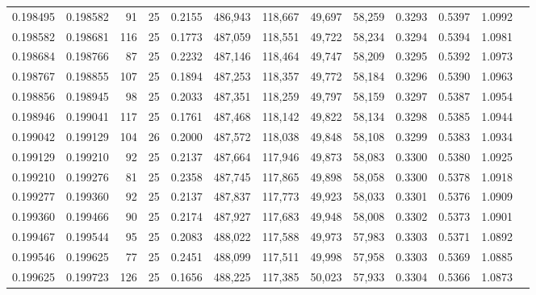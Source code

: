 \begin{tabular}{rrrrrrrrrrrrr}
0.198495 & 0.198582 &    91 &  25 &                                     0.2155 & 486,943 & 118,667 &  49,697 &  58,259 & 0.3293 & 0.5397 & 1.0992 \\
0.198582 & 0.198681 &   116 &  25 &                                     0.1773 & 487,059 & 118,551 &  49,722 &  58,234 & 0.3294 & 0.5394 & 1.0981 \\
0.198684 & 0.198766 &    87 &  25 &                                     0.2232 & 487,146 & 118,464 &  49,747 &  58,209 & 0.3295 & 0.5392 & 1.0973 \\
0.198767 & 0.198855 &   107 &  25 &                                     0.1894 & 487,253 & 118,357 &  49,772 &  58,184 & 0.3296 & 0.5390 & 1.0963 \\
0.198856 & 0.198945 &    98 &  25 &                                     0.2033 & 487,351 & 118,259 &  49,797 &  58,159 & 0.3297 & 0.5387 & 1.0954 \\
0.198946 & 0.199041 &   117 &  25 &                                     0.1761 & 487,468 & 118,142 &  49,822 &  58,134 & 0.3298 & 0.5385 & 1.0944 \\
0.199042 & 0.199129 &   104 &  26 &                                     0.2000 & 487,572 & 118,038 &  49,848 &  58,108 & 0.3299 & 0.5383 & 1.0934 \\
0.199129 & 0.199210 &    92 &  25 &                                     0.2137 & 487,664 & 117,946 &  49,873 &  58,083 & 0.3300 & 0.5380 & 1.0925 \\
0.199210 & 0.199276 &    81 &  25 &                                     0.2358 & 487,745 & 117,865 &  49,898 &  58,058 & 0.3300 & 0.5378 & 1.0918 \\
0.199277 & 0.199360 &    92 &  25 &                                     0.2137 & 487,837 & 117,773 &  49,923 &  58,033 & 0.3301 & 0.5376 & 1.0909 \\
0.199360 & 0.199466 &    90 &  25 &                                     0.2174 & 487,927 & 117,683 &  49,948 &  58,008 & 0.3302 & 0.5373 & 1.0901 \\
0.199467 & 0.199544 &    95 &  25 &                                     0.2083 & 488,022 & 117,588 &  49,973 &  57,983 & 0.3303 & 0.5371 & 1.0892 \\
0.199546 & 0.199625 &    77 &  25 &                                     0.2451 & 488,099 & 117,511 &  49,998 &  57,958 & 0.3303 & 0.5369 & 1.0885 \\
0.199625 & 0.199723 &   126 &  25 &                                     0.1656 & 488,225 & 117,385 &  50,023 &  57,933 & 0.3304 & 0.5366 & 1.0873 \\

\end{tabular}
